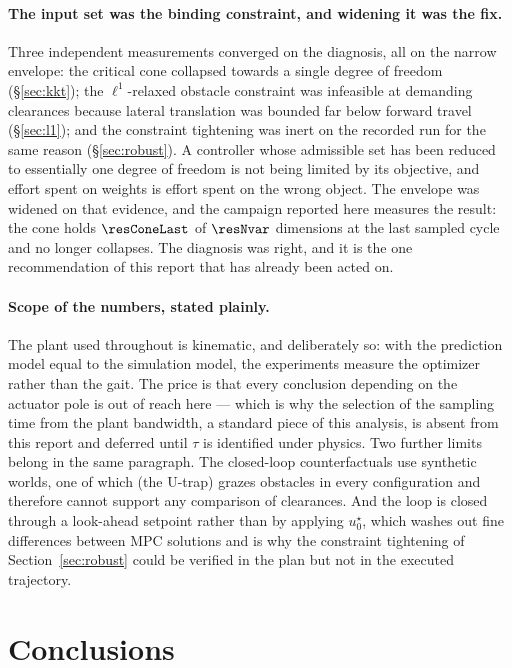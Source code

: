 \documentclass[11pt,a4paper]{article}
\begin{document}
\paragraph{The input set was the binding constraint, and widening it was the fix.} Three independent
measurements converged on the diagnosis, all on the narrow envelope: the critical cone collapsed towards a
single degree of freedom (\S\ref{sec:kkt}); the $\ell^1$-relaxed obstacle constraint was infeasible at
demanding clearances because lateral translation was bounded far below forward travel (\S\ref{sec:l1}); and
the constraint tightening was inert on the recorded run for the same reason (\S\ref{sec:robust}). A
controller whose admissible set has been reduced to essentially one degree of freedom is not being limited
by its objective, and effort spent on weights is effort spent on the wrong object. The envelope was widened
on that evidence, and the campaign reported here measures the result: the cone holds $\resConeLast$ of
$\resNvar$ dimensions at the last sampled cycle and no longer collapses. The diagnosis was right, and it is
the one recommendation of this report that has already been acted on.

\paragraph{Scope of the numbers, stated plainly.} The plant used throughout is kinematic, and deliberately
so: with the prediction model equal to the simulation model, the experiments measure the optimizer rather
than the gait. The price is that every conclusion depending on the actuator pole is out of reach here ---
which is why the selection of the sampling time from the plant bandwidth, a standard piece of this analysis,
is absent from this report and deferred until $\tau$ is identified under physics. Two further limits belong
in the same paragraph. The closed-loop counterfactuals use synthetic worlds, one of which (the U-trap) grazes
obstacles in every configuration and therefore cannot support any comparison of clearances. And the loop is
closed through a look-ahead setpoint rather than by applying $u^\star_0$, which washes out fine differences
between MPC solutions and is why the constraint tightening of Section~\ref{sec:robust} could be verified in
the plan but not in the executed trajectory.

\section{Conclusions}
\label{sec:conclusions}
\end{document}
